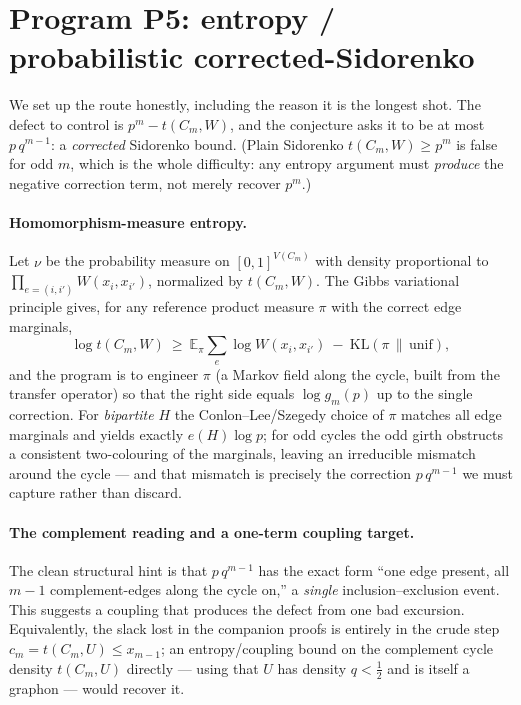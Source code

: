 \documentclass[11pt]{article}
\theoremstyle{definition}
\newcommand{\1}{\mathbf{1}}
\begin{document}
\section{Program P5: entropy / probabilistic corrected-Sidorenko}\label{sec:entropy}

We set up the route honestly, including the reason it is the longest shot. The
defect to control is $p^m-t(C_m,W)$, and the conjecture asks it to be at most
$p\,q^{m-1}$: a \emph{corrected} Sidorenko bound. (Plain Sidorenko
$t(C_m,W)\ge p^m$ is false for odd $m$, which is the whole difficulty: any
entropy argument must \emph{produce} the negative correction term, not merely
recover $p^m$.)

\paragraph{Homomorphism-measure entropy.}
Let $\nu$ be the probability measure on $[0,1]^{V(C_m)}$ with density
proportional to $\prod_{e=(i,i')}W(x_i,x_{i'})$, normalized by $t(C_m,W)$. The
Gibbs variational principle gives, for any reference product measure $\pi$ with
the correct edge marginals,
\[
\log t(C_m,W)\ \ge\ \mathbb{E}_\pi\!\sum_{e}\log W(x_i,x_{i'})\ -\ \mathrm{KL}(\pi\,\|\,\mathrm{unif}),
\]
and the program is to engineer $\pi$ (a Markov field along the cycle, built from
the transfer operator) so that the right side equals $\log g_m(p)$ up to the
single correction. For \emph{bipartite} $H$ the Conlon--Lee/Szegedy choice of
$\pi$ matches all edge marginals and yields exactly $e(H)\log p$; for odd cycles
the odd girth obstructs a consistent two-colouring of the marginals, leaving an
irreducible mismatch around the cycle --- and that mismatch is precisely the
correction $p\,q^{m-1}$ we must capture rather than discard.

\paragraph{The complement reading and a one-term coupling target.}
The clean structural hint is that $p\,q^{m-1}$ has the exact form ``one edge
present, all $m-1$ complement-edges along the cycle on,'' a \emph{single}
inclusion--exclusion event. This suggests a coupling that produces the defect
from one bad excursion. Equivalently, the slack lost in the companion proofs is
entirely in the crude step $c_m=t(C_m,U)\le x_{m-1}$; an entropy/coupling bound
on the complement cycle density $t(C_m,U)$ directly --- using that $U$ has
density $q<\tfrac12$ and is itself a graphon --- would recover it.
\end{document}
